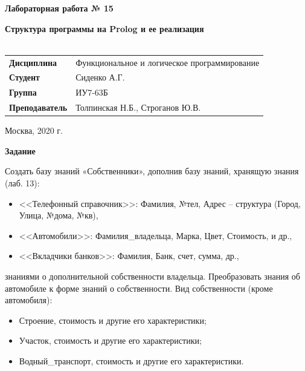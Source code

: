 \documentclass[a4paper,14pt]{extreport} %
\begin{document}
\begin{titlepage}
    \vspace{4cm}

    \begin{center}
        \textbf{Лабораторная работа № 15} \\ 
        \hfill
        
        \textbf{Структура программы на Prolog и ее реализация} \\
        \vspace{0.5cm}
        \textbf{} \\
    \end{center}

    \vspace{4cm}

    \begin{flushleft}
        \begin{tabular}{ll}
            \textbf{Дисциплина} & Функциональное и логическое программирование \\
            \textbf{Студент} & Сиденко А.Г. \\
            \textbf{Группа} & ИУ7-63Б \\
            \textbf{Преподаватель} & Толпинская Н.Б., Строганов Ю.В.  \\
        \end{tabular}
    \end{flushleft}

    \vspace{4cm}

   \begin{center}
        Москва, 2020 г.
    \end{center}

\end{titlepage}

\textbf{Задание}

Создать базу знаний «Собственники», дополнив базу знаний, хранящую знания (лаб. 13):
\begin{itemize}
\item <<Телефонный справочник>>: Фамилия, №тел, Адрес – структура (Город, Улица, №дома, №кв),
\item <<Автомобили>>: Фамилия\_владельца, Марка, Цвет, Стоимость, и др.,
\item <<Вкладчики банков>>: Фамилия, Банк, счет, сумма, др.,
\end{itemize}
знаниями о дополнительной собственности владельца. Преобразовать знания об автомобиле к форме знаний о собственности.
Вид собственности (кроме автомобиля):
\begin{itemize}
\item Строение, стоимость и другие его характеристики;
\item Участок, стоимость и другие его характеристики;
\item Водный\_транспорт, стоимость и другие его характеристики.
\end{itemize}
\end{document}
